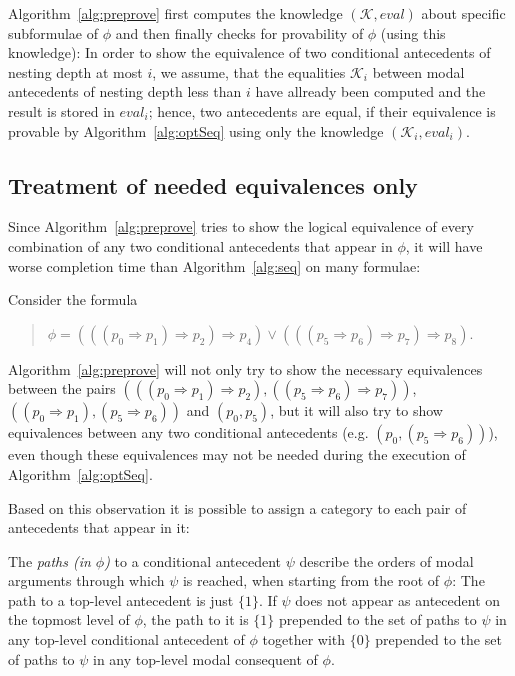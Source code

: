\documentclass{entcs} \usepackage{entcsmacro}
\begin{document}
Algorithm~\ref{alg:preprove} first computes the knowledge $(\mathcal{K},eval)$ about specific 
subformulae of $\phi$ and then finally checks for provability of
$\phi$ (using this knowledge): In order to show the equivalence of
two conditional antecedents of nesting depth at most $i$, we assume,
that the equalities $\mathcal{K}_{i}$ between modal antecedents of nesting depth less
than $i$ have allready been computed and the result is stored in $eval_i$; hence,
two antecedents are equal, if their equivalence is provable by
Algorithm~\ref{alg:optSeq} using only the knowledge $(\mathcal{K}_{i},eval_i)$.

\subsection{Treatment of needed equivalences only}

Since Algorithm~\ref{alg:preprove} tries to show the logical equivalence of every combination
of any two conditional antecedents that appear in $\phi$, it will have worse completion
time than Algorithm~\ref{alg:seq} on many formulae:

\begin{example}
Consider the formula 
\begin{quote}
$\phi=(((p_0\Rightarrow p_1)\Rightarrow p_2)\Rightarrow p_4)\vee
(((p_5\Rightarrow p_6)\Rightarrow p_7)\Rightarrow p_8)$.
\end{quote}
Algorithm~\ref{alg:preprove} will not only
try to show the necessary equivalences between the pairs
$(((p_0\Rightarrow p_1)\Rightarrow p_2), ((p_5\Rightarrow p_6)\Rightarrow p_7))$,
$((p_0\Rightarrow p_1), (p_5\Rightarrow p_6))$ and $(p_0,p_5)$, but it will
also try to show equivalences between any two conditional antecedents (e.g. $(p_0,
(p_5\Rightarrow p_6))$), even though these equivalences may not be needed
during the execution of Algorithm~\ref{alg:optSeq}.
\end{example}

Based on this observation it is possible to assign a category to each pair of
antecedents that appear in it:

\begin{definition}
The \emph{paths (in $\phi$)} to a conditional antecedent $\psi$ describe the orders
of modal arguments through which $\psi$ is reached, when starting from the root
of $\phi$:
The path to a top-level antecedent is just $\{1\}$. If $\psi$ does not appear as
antecedent on the topmost level of $\phi$, the path to it is $\{1\}$ prepended to the set
of paths to $\psi$ in any top-level conditional antecedent of $\phi$ together with $\{0\}$
prepended to the set of paths to $\psi$ in any top-level modal consequent of $\phi$.
\end{definition}
\end{document}
